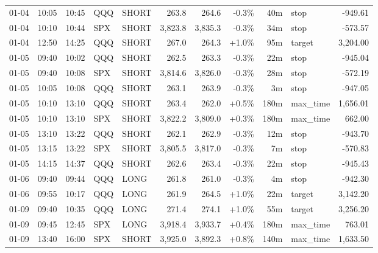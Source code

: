 \documentclass[11pt,a4paper,twoside]{article}
\begin{document}
\begin{center}
\begin{longtable}{>{\color{txtmain}}l l l l l r r r r >{\color{txtmain}}l r}
01-04 & 10:05 & 10:45 & QQQ & SHORT & 263.8 & 264.6 & \textcolor{lossred}{-0.3\%} & 40m & stop & \textcolor{lossred}{-949.61} \\
01-04 & 10:10 & 10:44 & SPX & SHORT & 3,823.8 & 3,835.3 & \textcolor{lossred}{-0.3\%} & 34m & stop & \textcolor{lossred}{-573.57} \\
01-04 & 12:50 & 14:25 & QQQ & SHORT & 267.0 & 264.3 & \textcolor{wingreen}{+1.0\%} & 95m & target & \textcolor{wingreen}{3,204.00} \\
01-05 & 09:40 & 10:02 & QQQ & SHORT & 262.5 & 263.3 & \textcolor{lossred}{-0.3\%} & 22m & stop & \textcolor{lossred}{-945.04} \\
01-05 & 09:40 & 10:08 & SPX & SHORT & 3,814.6 & 3,826.0 & \textcolor{lossred}{-0.3\%} & 28m & stop & \textcolor{lossred}{-572.19} \\
01-05 & 10:05 & 10:08 & QQQ & SHORT & 263.1 & 263.9 & \textcolor{lossred}{-0.3\%} & 3m & stop & \textcolor{lossred}{-947.05} \\
01-05 & 10:10 & 13:10 & QQQ & SHORT & 263.4 & 262.0 & \textcolor{wingreen}{+0.5\%} & 180m & max\_time & \textcolor{wingreen}{1,656.01} \\
01-05 & 10:10 & 13:10 & SPX & SHORT & 3,822.2 & 3,809.0 & \textcolor{wingreen}{+0.3\%} & 180m & max\_time & \textcolor{wingreen}{662.00} \\
01-05 & 13:10 & 13:22 & QQQ & SHORT & 262.1 & 262.9 & \textcolor{lossred}{-0.3\%} & 12m & stop & \textcolor{lossred}{-943.70} \\
01-05 & 13:15 & 13:22 & SPX & SHORT & 3,805.5 & 3,817.0 & \textcolor{lossred}{-0.3\%} & 7m & stop & \textcolor{lossred}{-570.83} \\
01-05 & 14:15 & 14:37 & QQQ & SHORT & 262.6 & 263.4 & \textcolor{lossred}{-0.3\%} & 22m & stop & \textcolor{lossred}{-945.43} \\
01-06 & 09:40 & 09:44 & QQQ & LONG & 261.8 & 261.0 & \textcolor{lossred}{-0.3\%} & 4m & stop & \textcolor{lossred}{-942.30} \\
01-06 & 09:55 & 10:17 & QQQ & LONG & 261.9 & 264.5 & \textcolor{wingreen}{+1.0\%} & 22m & target & \textcolor{wingreen}{3,142.20} \\
01-09 & 09:40 & 10:35 & QQQ & LONG & 271.4 & 274.1 & \textcolor{wingreen}{+1.0\%} & 55m & target & \textcolor{wingreen}{3,256.20} \\
01-09 & 09:45 & 12:45 & SPX & LONG & 3,918.4 & 3,933.7 & \textcolor{wingreen}{+0.4\%} & 180m & max\_time & \textcolor{wingreen}{763.01} \\
01-09 & 13:40 & 16:00 & SPX & SHORT & 3,925.0 & 3,892.3 & \textcolor{wingreen}{+0.8\%} & 140m & max\_time & \textcolor{wingreen}{1,633.50} \\

\end{longtable}
\end{center}
\end{document}
